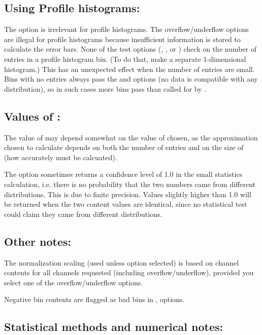 \subsection*{Using Profile histograms:}

The  option is irrelevant for profile histograms.  
The overflow/underflow options are illegal for profile histograms because 
insufficient information is stored to calculate the error bars.  
None of the test options (, , or ) check on the number
of entries in a profile histogram bin.  
(To do that, make a separate 1-dimensional histogram.)  
This has an unexpected effect when the number of entries are small.  
Bins with no entries always pass the  and  options 
(no data is compatible with any distribution), so in such
cases more bins pass than called for by .

\subsection*{Values of :}

The value of  may depend somewhat on the value of 
chosen, as the approximation chosen to calculate  depends 
on both the number of entries and on the size of  
(how accurately  must be calcuated).

The  option sometimes returns a confidence level of 1.0 in the small
statistics calculation, i.e. there is no probability that the two numbers
came from different distributions.  
This is due to finite precision.
Values slightly higher than 1.0 will be returned when the two content
values are identical, since no statistical test could claim they came from
different distributions.

\subsection*{Other notes:}

The normalization scaling (used unless  option selected) is based on
channel contents for all channels requested (including overflow/underflow),
provided you select one of the overflow/underflow options.

Negative bin contents are flagged as bad bins in ,  options.

\subsection*{Statistical methods and numerical notes:}

